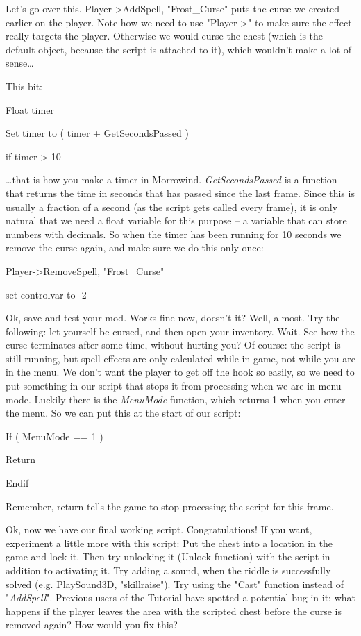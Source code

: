 

Let's go over this. Player-\textgreater AddSpell, "Frost\_Curse" puts the curse we created earlier on the player. Note how we need to use "Player-\textgreater" to make sure the effect really targets the player. Otherwise we would curse the chest (which is the default object, because the script is attached to it), which wouldn't make a lot of sense\ldots{}


This bit:

Float timer

Set timer to ( timer + GetSecondsPassed )

if timer \textgreater{} 10

\ldots that is how you make a timer in Morrowind. \emph{GetSecondsPassed} is a function that returns the time in seconds that has passed since the last frame. Since this is usually a fraction of a second (as the script gets called every frame), it is only natural that we need a float variable for this purpose -- a variable that can store numbers with decimals. So when the timer has been running for 10 seconds we remove the curse again, and make sure we do this only once:

Player-\textgreater RemoveSpell, "Frost\_Curse"

set controlvar to -2

Ok, save and test your mod. Works fine now, doesn't it? Well, almost. Try the following: let yourself be cursed, and then open your inventory. Wait. See how the curse terminates after some time, without hurting you? Of course: the script is still running, but spell effects are only calculated while in game, not while you are in the menu. We don't want the player to get off the hook so easily, so we need to put something in our script that stops it from processing when we are in menu mode. Luckily there is the \emph{MenuMode} function, which returns 1 when you enter the menu. So we can put this at the start of our script:

If ( MenuMode == 1 )

Return

Endif

Remember, return tells the game to stop processing the script for this frame.

Ok, now we have our final working script. Congratulations! If you want, experiment a little more with this script: Put the chest into a location in the game and lock it. Then try unlocking it (Unlock function) with the script in addition to activating it. Try adding a sound, when the riddle is successfully solved (e.g. PlaySound3D, "skillraise"). Try using the "Cast" function instead of "\emph{AddSpell}". Previous users of the Tutorial have spotted a potential bug in it: what happens if the player leaves the area with the scripted chest before the curse is removed again? How would you fix this?

